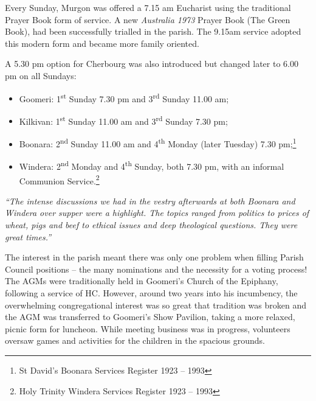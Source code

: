 Every Sunday, Murgon was offered a 7.15 am Eucharist using the traditional Prayer Book form of service. A new \emph{Australia 1973} Prayer Book (The Green Book), had been successfully trialled in the parish. The 9.15am service adopted this modern form and became more family oriented.



A 5.30 pm option for Cherbourg was also introduced but changed later to 6.00 pm on all Sundays:



\begin{itemize}

\item

  Goomeri: 1\textsuperscript{st} Sunday 7.30 pm and 3\textsuperscript{rd} Sunday 11.00 am;

\item

  Kilkivan: 1\textsuperscript{st} Sunday 11.00 am and 3\textsuperscript{rd} Sunday 7.30 pm;

\end{itemize}



\begin{itemize}

\item

  Boonara: 2\textsuperscript{nd} Sunday 11.00 am and 4\textsuperscript{th} Monday (later Tuesday) 7.30 pm;\footnote{St David's Boonara Services Register 1923 -- 1993}
\item

  Windera: 2\textsuperscript{nd} Monday and 4\textsuperscript{th} Sunday, both 7.30 pm, with an informal Communion Service.\footnote{Holy Trinity Windera Services Register 1923 -- 1993}
\end{itemize}



\emph{``The intense discussions we had in the vestry afterwards at both Boonara and Windera over supper were a highlight. The topics ranged from politics to prices of wheat, pigs and beef to ethical issues and deep theological questions. They were great times.''}



The interest in the parish meant there was only one problem when filling Parish Council positions -- the many nominations and the necessity for a voting process! The AGMs were traditionally held in Goomeri's Church of the Epiphany, following a service of HC. However, around two years into his incumbency, the overwhelming congregational interest was so great that tradition was broken and the AGM was transferred to Goomeri's Show Pavilion, taking a more relaxed, picnic form for luncheon. While meeting business was in progress, volunteers oversaw games and activities for the children in the spacious grounds.



